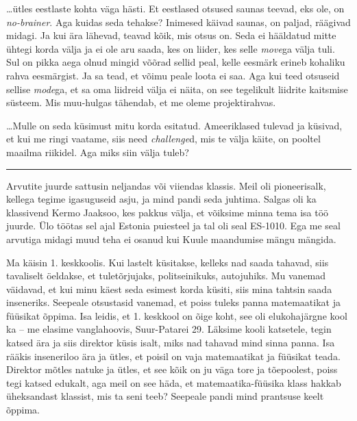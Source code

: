 
\ldots ütles eestlaste kohta väga hästi. Et eestlased otsused saunas 
teevad, eks ole, on \emph{no-brainer}. Aga kuidas seda tehakse? 
Inimesed käivad saunas, on paljad, räägivad midagi. Ja kui ära 
lähevad,  teavad kõik, mis otsus on. Seda ei hääldatud mitte ühtegi korda 
välja 
ja ei ole aru saada, kes on liider, kes selle \emph{move}ga välja tuli. 
Sul on pikka aega olnud mingid võõrad sellid peal, 
kelle eesmärk erineb kohaliku rahva eesmärgist. Ja sa tead, et võimu 
peale loota ei saa. Aga kui teed otsuseid sellise \emph{mode}ga, et sa oma 
liidreid välja ei näita, on see tegelikult liidrite kaitsmise süsteem. Mis 
muu-hulgas tähendab, et me oleme projektirahvas. 

\ldots Mulle on seda küsimust mitu korda esitatud. Ameeriklased tulevad ja 
küsivad, et kui me ringi vaatame, siis need \emph{challenge}d, mis te 
välja käite, on  pooltel maailma riikidel. Aga miks siin välja tuleb?

\bigskip
\noindent\rule{.3\textwidth}{.7pt}
\bigskip


Arvutite juurde sattusin neljandas või viiendas klassis. Meil oli pioneerisalk, kellega tegime igasuguseid asju, ja mind pandi seda juhtima. Salgas oli ka klassivend Kermo 
Jaaksoo, kes pakkus välja, et võiksime 
minna tema isa töö juurde. Ülo töötas sel ajal 
Estonia puiesteel ja tal oli seal ES-1010. Ega me seal arvutiga midagi muud teha ei 
osanud kui Kuule maandumise mängu mängida. 

Ma käisin 1. keskkoolis. Kui lastelt küsitakse, kelleks nad saada tahavad, siis tavaliselt 
öeldakse, et tuletõrjujaks, politseinikuks, autojuhiks. Mu vanemad 
väidavad, et kui minu käest seda esimest korda küsiti, siis mina tahtsin saada
inseneriks. Seepeale otsustasid
vanemad, et poiss tuleks panna matemaatikat ja füüsikat õppima. Isa leidis, et 1. keskkool on õige koht, see 
oli elukohajärgne kool ka -- me elasime vanglahoovis, Suur-Patarei 29. 
Läksime kooli katsetele, tegin katsed ära ja siis direktor küsis isalt, 
miks nad tahavad mind sinna panna. Isa rääkis inseneriloo ära ja ütles, et poisil on vaja 
matemaatikat ja füüsikat teada. Direktor mõtles natuke ja ütles, et see kõik on ju väga tore ja tõepoolest, poiss tegi katsed 
edukalt, aga meil on see häda, et matemaatika-füüsika klass hakkab üheksandast 
klassist, mis ta seni teeb? Seepeale pandi mind prantsuse keelt õppima.

